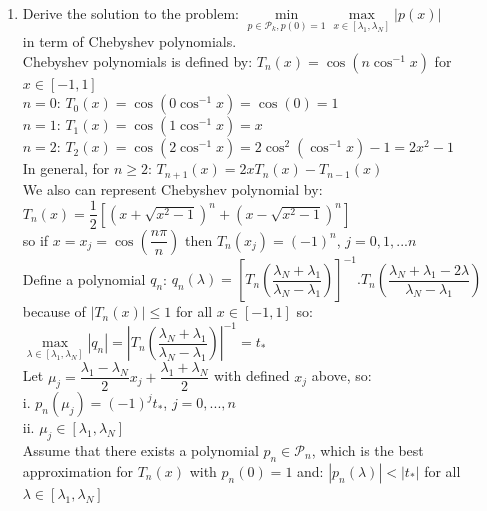 \documentclass[14pt,a4paper]{article}
\begin{document}
\begin{enumerate}
	\label{4a}
	\item Derive the solution to the problem: \hspace{0.3cm} $ \min\limits_{p \in \mathcal{P}_k,p(0) =1} \max\limits_{x\in[\lambda_1,\lambda_N]} |p(x)|$\\
	in term of Chebyshev polynomials.\\
	Chebyshev polynomials is defined by: $T_n(x) = \cos(n\cos^{-1}x)$ for $x \in [-1,1]$\\
	$n = 0$: $T_0(x) = \cos(0\cos^{-1}x) = \cos(0) = 1$\\
	$n = 1$: $T_1(x) = \cos(1\cos^{-1}x) = x$\\
	$n = 2$: $T_2(x) = \cos(2\cos^{-1}x) = 2\cos^2(\cos^{-1}x) - 1 = 2x^2 -1$\\
	In general, for $n \geq 2$: $T_{n+1}(x) = 2xT_n(x) - T_{n-1}(x)$\\
	We also can represent Chebyshev polynomial by:\\
	\hspace*{3cm} $T_n(x) = \dfrac{1}{2}\left[(x+\sqrt{x^2-1})^n + (x - \sqrt{x^2-1})^n\right]$\\
	so if $x = x_j = \cos(\dfrac{n\pi}{n})$ then $T_n(x_j) = (-1)^n$, $j = 0,1,...n$\\
	Define a polynomial $q_n$: $q_n(\lambda) = \left[ T_n\left(\dfrac{\lambda_N+\lambda_1}{\lambda_N-\lambda_1}\right)\right]^{-1}.T_n\left(\dfrac{\lambda_N + \lambda_1 - 2\lambda}{\lambda_N - \lambda_1}\right)$ \\
	because of $|T_n(x)| \leq 1$ for all $x \in [-1,1]$ so:\\
	\hspace*{4cm} $\max\limits_{\lambda \in [\lambda_1,\lambda_N]}|q_n| = \left|T_n\left(\dfrac{\lambda_N+\lambda_1}{\lambda_N-\lambda_1}\right)\right|^{-1} = t_*$ \\
	Let $\mu_j = \dfrac{\lambda_1 - \lambda_N}{2}x_j + \dfrac{\lambda_1 + \lambda_N}{2}$ with defined $x_j$ above, so:\\
	\hspace*{1cm} i. $p_n(\mu_j) = (-1)^jt_*$, $j = 0,..., n$\\
	\hspace*{1cm}  ii. $\mu_j \in [\lambda_1, \lambda_N]$\\
	Assume that there exists a polynomial $p_n \in \mathcal{P}_n$, which is the best approximation for $T_n(x)$ with $p_n(0) = 1$ and: $|p_n(\lambda)| < |t_*|$ for all $\lambda \in [\lambda_1, \lambda_N]$\\

\end{enumerate}
\end{document}
